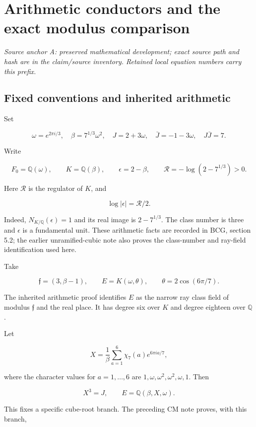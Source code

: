 \section{Arithmetic conductors and the exact modulus comparison}\label{sec:stark}
\noindent\textit{Source anchor A: preserved mathematical development; exact source path and hash are in the claim/source inventory. Retained local equation numbers carry this prefix.}\par
\hypertarget{A-fixed-conventions-and-inherited-arithmetic}{%
\subsection{Fixed conventions and inherited
arithmetic}\label{A-fixed-conventions-and-inherited-arithmetic}}

Set

\[
\omega=e^{2\pi i/3},\quad \beta=7^{1/3}\omega^2,\quad
J=2+3\omega,\quad \bar J=-1-3\omega,\quad J\bar J=7.
\]

Write

\[
F_0=\mathbb Q(\omega),\qquad K=\mathbb Q(\beta),\qquad
\epsilon=2-\beta,\qquad \mathcal R=-\log(2-7^{1/3})>0.
\]

Here \(\mathcal R\) is the regulator of \(K\), and

\[
\log|\epsilon|=\mathcal R/2. \tag{A1.1}
\]

Indeed, \(N_{K/\mathbb Q}(\epsilon)=1\) and its real image is
\(2-7^{1/3}\). The class number is three and \(\epsilon\) is a
fundamental unit. These arithmetic facts are recorded in BCG, section
5.2; the earlier unramified-cubic note also proves the class-number and
ray-field identification used here.

Take

\[
\mathfrak f=(3,\beta-1),\qquad
E=K(\omega,\theta),\qquad \theta=2\cos(6\pi/7).
\]

The inherited arithmetic proof identifies \(E\) as the narrow ray class
field of modulus \(\mathfrak f\) and the real place. It has degree six
over \(K\) and degree eighteen over \(\mathbb Q\).

Let

\[
X=\frac1\beta\sum_{a=1}^{6}\chi_7(a)e^{6\pi ia/7},
\]

where the character values for \(a=1,\ldots,6\) are
\(1,\omega,\omega^2,\omega^2,\omega,1\). Then

\[
X^3=J,\qquad E=\mathbb Q(\beta,X,\omega). \tag{A1.2}
\]

This fixes a specific cube-root branch. The preceding CM note proves,
with this branch,

